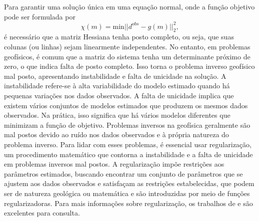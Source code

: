 Para garantir uma solução única em uma equação normal, onde a função objetivo pode ser formulada por
\begin{equation}
	\chi(m) = \text{min}||d^{obs} -g(m)||^2_2,
\end{equation}
\noindent é necessário que a matriz Hessiana tenha posto completo, ou seja, que suas colunas (ou linhas) sejam linearmente independentes. No entanto, em problemas geofísicos, é comum que a matriz do sistema tenha um determinante próximo de zero, o que indica falta de posto completo. Isso torna o problema inverso geofísico mal posto, apresentando instabilidade e falta de unicidade na solução. A instabilidade refere-se à alta variabilidade do modelo estimado quando há pequenas variações nos dados observados. A falta de unicidade implica que existem vários conjuntos de modelos estimados que produzem os mesmos dados observados. Na prática, isso significa que há vários modelos diferentes que minimizam a função de objetivo. Problemas inversos na geofísica geralmente são mal postos devido ao ruído nos dados observados e à própria natureza do problema inverso. Para lidar com esses problemas, é essencial usar regularização, um procedimento matemático que contorna a instabilidade e a falta de unicidade em problemas inversos mal postos. A regularização impõe restrições aos parâmetros estimados, buscando encontrar um conjunto de parâmetros que se ajustem aos dados observados e satisfaçam as restrições estabelecidas, que podem ser de natureza geológica ou matemática e são introduzidas por meio de funções regularizadoras. Para mais informações sobre regularização, os trabalhos de  e  são excelentes para consulta.   

